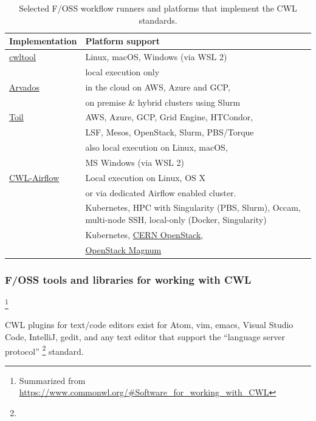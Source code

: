 \documentclass[sigconf,authordraft]{acmart}
\begin{document}
\begin{table}
  \caption{Selected F/OSS workflow runners and platforms that implement the CWL standards.}
  \label{tab:runners}
    \begin{tabular}{ll}
      \toprule
      Implementation & Platform support\\
      \midrule
      \href{https://pypi.org/project/cwltool}{cwltool} & Linux, macOS, Windows (via WSL 2) \\
      & local execution only\\
      \href{https://arvados.org}{Arvados} & in the cloud on AWS, Azure and GCP, \\
      & on premise \& hybrid clusters using Slurm\\
      \href{https://pypi.org/project/toil-cwl-runner}{Toil} & AWS, Azure, GCP, Grid Engine, HTCondor, \\
      & LSF, Mesos, OpenStack, Slurm, PBS/Torque\\
      & also local execution on Linux, macOS, \\
      & MS Windows (via WSL 2)\\
      \href{https://pypi.org/project/cwl-airflow}{CWL-Airflow} & Local execution on Linux, OS X\\
      & or via dedicated Airflow enabled cluster.\\
      \addition{\href{https://streamflow.di.unito.it/}{StreamFlow}\cite{colonnelli_streamflow_2020} & Kubernetes, HPC with Singularity (PBS, Slurm), Occam, multi-node SSH, local-only (Docker, Singularity)\\}
      \href{https://docs.reana.io/}{REANA} & Kubernetes, \href{https://clouddocs.web.cern.ch/clouddocs/containers/}{CERN OpenStack},\\
      & \href{https://wiki.openstack.org/wiki/Magnum}{OpenStack Magnum}\\
      \bottomrule
\end{tabular}
\end{table}

\subsubsection{F/OSS tools and libraries for working with CWL }\footnote{Summarized from \url{https://www.commonwl.org/\#Software_for_working_with_CWL}}\label{sec:sidebar:b:workwith}

CWL plugins for text/code editors exist for Atom, vim, emacs, Visual Studio Code, IntelliJ, gedit, and any text editor that support the ``language server protocol'' \footnote{} standard.
\end{document}
